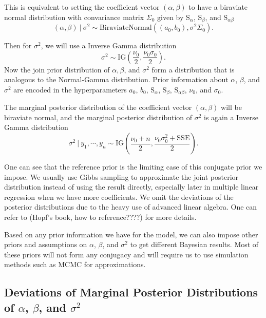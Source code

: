 \documentclass[]{book}
\theoremstyle{definition}
\theoremstyle{definition}
\theoremstyle{definition}
\theoremstyle{remark}
\begin{document}
This is equivalent to setting the coefficient vector \((\alpha, \beta)\)
to have a biraviate normal distribution with convariance matrix
\(\Sigma_0\) given by \(\text{S}_\alpha\), \(\text{S}_{\beta}\), and
\(\text{S}_{\alpha\beta}\)
\[ (\alpha, \beta) ~|~\sigma^2 \sim \text{BiraviateNormal}((a_0, b_0), \sigma^2\Sigma_0). \]

Then for \(\sigma^2\), we will use a Inverse Gamma distribution
\[ \sigma^2 \sim \text{IG}\left(\frac{\nu_0}{2}, \frac{\nu_0\sigma_0}{2}\right). \]
Now the join prior distribution of \(\alpha, \beta\), and \(\sigma^2\)
form a distribution that is analogous to the Normal-Gamma distribution.
Prior information about \(\alpha\), \(\beta\), and \(\sigma^2\) are
encoded in the hyperparameters \(a_0\), \(b_0\), \(\text{S}_\alpha\),
\(\text{S}_\beta\), \(\text{S}_{\alpha\beta}\), \(\nu_0\), and
\(\sigma_0\).

The marginal posterior distribution of the coefficient vector
\((\alpha, \beta)\) will be biraviate normal, and the marginal posterior
distribution of \(\sigma^2\) is again a Inverse Gamma distribution
\[ \sigma^2~|~y_1,\cdots,y_n \sim \text{IG}\left(\frac{\nu_0+n}{2}, \frac{\nu_0\sigma_0^2+\text{SSE}}{2}\right). \]

One can see that the reference prior is the limiting case of this
conjugate prior we impose. We usually use Gibbs sampling to approximate
the joint posterior distribution instead of using the result directly,
especially later in multiple linear regression when we have more
coefficients. We omit the deviations of the posterior distributions due
to the heavy use of advanced linear algebra. One can refer to (Hopf's
book, how to reference????) for more details.

Based on any prior information we have for the model, we can also impose
other priors and assumptions on \(\alpha\), \(\beta\), and \(\sigma^2\)
to get different Bayesian results. Most of these priors will not form
any conjugacy and will require us to use simulation methods such as MCMC
for approximations.

\subsection{\texorpdfstring{Deviations of Marginal Posterior
Distributions of \(\alpha\), \(\beta\), and
\(\sigma^2\)}{Deviations of Marginal Posterior Distributions of \textbackslash{}alpha, \textbackslash{}beta, and \textbackslash{}sigma\^{}2}}\label{deviations-of-marginal-posterior-distributions-of-alpha-beta-and-sigma2}
\end{document}
